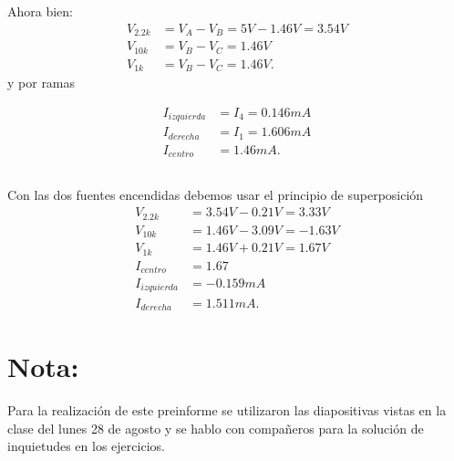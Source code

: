 \documentclass[a4paper, amsfonts, amssymb, amsmath, reprint, showkeys, nofootinbib, twoside]{revtex4-1}
\begin{document}
Ahora bien:
\begin{align*}
  V_{2.2k} &= V_A - V_B = 5V-1.46V=3.54V \\
  V_{10k} &= V_B - V_C = 1.46V \\
  V_{1k} &= V_B - V_C = 1.46V
.\end{align*}
y por ramas

\begin{align*}
  I_{izquierda}&= I_{4}=0.146mA \\
  I_{derecha}&= I_1=1.606mA \\
  I_{centro}&= 1.46mA
.\end{align*}

\subsection{}
Con las dos fuentes encendidas debemos usar el principio de superposición
\begin{align*}
  V_{2.2k}&= 3.54V-0.21V=3.33V \\
  V_{10k}&= 1.46V-3.09V=-1.63V \\
  V_{1k} &= 1.46V+0.21V=1.67V \\
  I_{centro} &= 1.67 \\
  I_{izquierda} &= -0.159 mA \\
  I_{derecha} &= 1.511 mA
.\end{align*}
\section{Nota:}
Para la realización de este preinforme se utilizaron las diapositivas vistas en la clase del lunes 28 de agosto y se hablo con compañeros para la solución de inquietudes en los ejercicios.
\end{document}
